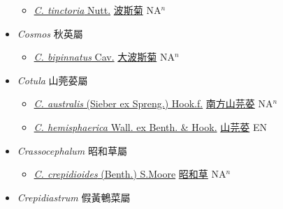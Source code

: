 \begin{itemize}
  \begin{itemize}
        \item[] \href{http://www.theplantlist.org/tpl1.1/search?q=Coreopsis+tinctoria}{\textit{C. tinctoria} Nutt.}   \href{\detokenize{http://taibnet.sinica.edu.tw/chi/taibnet_species_list.php?T2=波斯菊&T2_new_value=true&fr=y}}{波斯菊} NA$^n$
  \end{itemize}
 \item[] \textit{Cosmos} 秋英屬
                    
  \begin{itemize}
        \item[] \href{http://www.theplantlist.org/tpl1.1/search?q=Cosmos+bipinnatus}{\textit{C. bipinnatus} Cav.}   \href{\detokenize{http://taibnet.sinica.edu.tw/chi/taibnet_species_list.php?T2=大波斯菊&T2_new_value=true&fr=y}}{大波斯菊} NA$^n$
  \end{itemize}
 \item[] \textit{Cotula} 山莞荽屬
                    
  \begin{itemize}
        \item[] \href{http://www.theplantlist.org/tpl1.1/search?q=Cotula+australis}{\textit{C. australis} (Sieber ex Spreng.) Hook.f.}   \href{\detokenize{http://taibnet.sinica.edu.tw/chi/taibnet_species_list.php?T2=南方山芫荽&T2_new_value=true&fr=y}}{南方山芫荽} NA$^n$
        \item[] \href{http://www.theplantlist.org/tpl1.1/search?q=Cotula+hemisphaerica}{\textit{C. hemisphaerica} Wall. ex Benth. \& Hook.}   \href{\detokenize{http://taibnet.sinica.edu.tw/chi/taibnet_species_list.php?T2=山芫荽&T2_new_value=true&fr=y}}{山芫荽} EN
  \end{itemize}
 \item[] \textit{Crassocephalum} 昭和草屬
                    
  \begin{itemize}
        \item[] \href{http://www.theplantlist.org/tpl1.1/search?q=Crassocephalum+crepidioides}{\textit{C. crepidioides} (Benth.) S.Moore}   \href{\detokenize{http://taibnet.sinica.edu.tw/chi/taibnet_species_list.php?T2=昭和草&T2_new_value=true&fr=y}}{昭和草} NA$^n$
  \end{itemize}
 \item[] \textit{Crepidiastrum} 假黃鵪菜屬
                    

\end{itemize}
